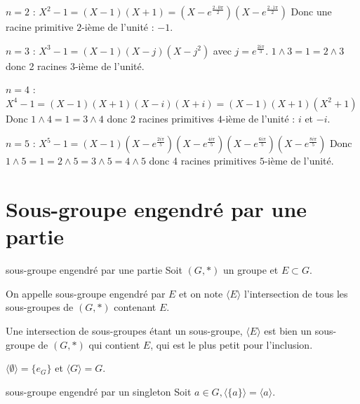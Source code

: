 \begin{exemple}
    $n = 2$ : $X^2 - 1 = (X - 1)(X + 1) = (X - e^{\frac{2 \cdot 0 \pi} 2})(X - e^{\frac{2 \cdot 1 \pi}2})$
    Donc une racine primitive $2$-ième de l'unité : $-1$.
    
    \avspace $n = 3$ : $X^3 - 1 = (X - 1)(X - j)(X - j^2)$ avec $j = e^{\frac{2i\pi}3}$.
    $1 \wedge 3 = 1 = 2 \wedge 3$ donc 2 racines $3$-ième de l'unité.

    \avspace $n = 4$ : $X^4 - 1 = (X - 1)(X + 1)(X - i)(X + i) = (X - 1)(X + 1)(X^2 + 1)$
    Donc $1 \wedge 4 = 1 = 3 \wedge 4$ donc 2 racines primitives $4$-ième de l'unité : $i$ et $-i$.
    
    \avspace $n = 5$ : $X^5 - 1 = (X - 1)(X - e^{\frac{2i\pi}5})(X - e^{\frac{4i\pi}5})(X - e^{\frac{6i\pi}5})(X - e^{\frac{8i\pi}5})$
    Donc $1 \wedge 5 = 1 = 2 \wedge 5 = 3 \wedge 5 = 4 \wedge 5$ donc 4 racines primitives $5$-ième de l'unité.


\end{exemple}

\section{Sous-groupe engendré par une partie }

\begin{definition}{sous-groupe engendré par une partie}{}
    Soit $(G, \ast)$ un groupe et $E \subset G$.

    On appelle sous-groupe engendré par $E$ et on note $\langle E \rangle$
    l'intersection de tous les sous-groupes de $(G, \ast)$ contenant $E$.
\end{definition}

\begin{remarque}
    Une intersection de sous-groupes étant un sous-groupe, $\langle E \rangle$ est bien un sous-groupe de $(G, \ast)$
    qui contient $E$, qui est le plus petit pour l'inclusion.
\end{remarque}

\begin{exemple}
    $\langle \emptyset \rangle = \{e_G\}$ et $\langle G \rangle = G$.
\end{exemple}

\begin{proposition}{sous-groupe engendré par un singleton}{}
    Soit $a \in G, \langle \{a\} \rangle = \langle a \rangle$.
\end{proposition}

